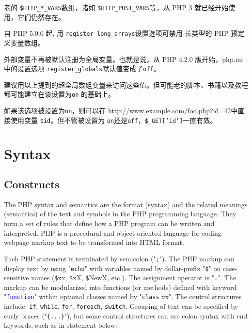 老的 \texttt{\$HTTP\_*\_VARS}数组，诸如 \texttt{\$HTTP\_POST\_VARS}等，从 PHP 3 就已经开始使用，它们仍然存在。


自 PHP 5.0.0 起, 用 \texttt{register\_long\_arrays}设置选项可禁用 长类型的 PHP 预定义变量数组。


\begin{compactitem}
\item 外部变量不再被默认注册为全局变量。也就是说，从 PHP 4.2.0 版开始，php.ini 中的设置选项 \texttt{register\_globals}默认值变成了\texttt{off}。

\end{compactitem}

建议用以上提到的超全局数组变量来访问这些值。但可能老的脚本、书籍以及教程都可能建立在该设置为\texttt{on} 的基础上。

如果该选项被设置为\texttt{on}，则可以在 \url{http://www.example.com/foo.php?id=42}中直接使用变量 \texttt{\$id}。但不管被设置为 \texttt{on}还是\texttt{off}，\texttt{\$\_GET['id']}一直有效。







\chapter{Syntax}


\section{Constructs}


The PHP syntax and semantics are the format (syntax) and the related meanings (semantics) of the text and symbols in the PHP programming language. They form a set of rules that define how a PHP program can be written and interpreted. PHP is a procedural and object-oriented language for coding webpage markup text to be transformed into HTML format.


Each PHP statement is terminated by semicolon ("\texttt{;}"). The PHP markup can display text by using "\texttt{echo}" with variables named by dollar-prefix "\texttt{\$}" on case-sensitive names (\texttt{\$}xx, \texttt{\$}xX, \texttt{\$}NewX, etc.). The assignment operator is "\texttt{=}". The markup can be modularized into functions (or methods) defined with keyword "\textcolor{Blue}{\texttt{function}}" within optional classes named by "\texttt{class} xx". The control structures include: \texttt{if}, \texttt{while}, \texttt{for}, \texttt{foreach}, \texttt{switch}. Grouping of text can be specified by curly braces ("\texttt{\{...\}}"), but some control structures can use colon syntax with end keywords, such as in statement below:

